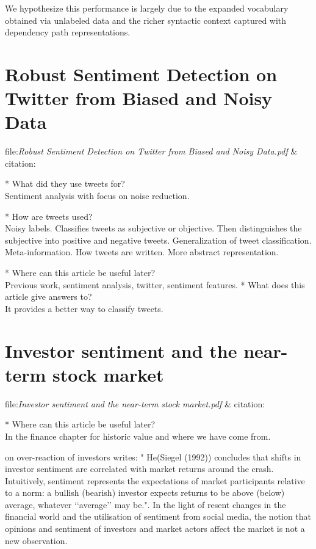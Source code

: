 We hypothesize this performance is largely due to the expanded vocabulary obtained via unlabeled data and the richer syntactic context captured with dependency path representations. \cite[]{becker13}


\section{Robust Sentiment Detection on Twitter from Biased and Noisy Data}
file:\textit{Robust Sentiment Detection on Twitter from Biased and Noisy
Data.pdf} & citation:\cite[]{barbosa10}

* What did they use tweets for?\\
Sentiment analysis with focus on noise reduction. 

* How are tweets used?\\
Noisy labels. Classifies tweets as subjective or objective. Then distinguishes
the subjective into positive and negative tweets.  
Generalization of tweet classification. Meta-information. How tweets are
written. More abstract representation.

* Where can this article be useful later? \\
Previous work, sentiment analysis, twitter, sentiment features. 
* What does this article give answers to?\\
It provides a better way to classify tweets. 

\section{Investor sentiment and the near-term stock market}
file:\textit{Investor sentiment and the near-term stock market.pdf} & citation:\cite[]{Brown20041}

* Where can this article be useful later? \\
In the finance chapter for historic value and where we have come from. 

\cite[p2]{brown20041} on over-reaction of investors writes: "
He(Siegel (1992)) concludes that shifts in investor sentiment are correlated with market
returns around the crash. Intuitively, sentiment represents the expectations of market participants
relative to a norm: a bullish (bearish) investor expects returns to be above
(below) average, whatever ‘‘average’’ may be.". In the light of resent changes
in the financial world and the utilisation of sentiment from social media, the
notion that opinions and sentiment of investors and market actors affect the
market is not a new observation. 

